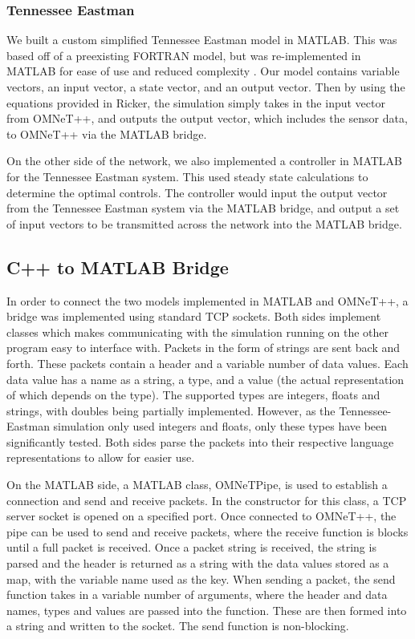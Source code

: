 \subsubsection{Tennessee Eastman}
  We built a custom simplified Tennessee Eastman model in MATLAB.  
  This was based off of a preexisting FORTRAN model, but was
  re-implemented in MATLAB for ease of use and reduced complexity 
  .  Our model contains variable vectors, an
  input vector, a state vector, and an output vector. Then by 
  using the equations provided in Ricker, the
  simulation simply takes in the input vector from OMNeT++, and
  outputs the output vector, which includes the sensor data, to
  OMNeT++ via the MATLAB bridge.

  On the other side of the network, we also implemented a 
  controller in MATLAB for the Tennessee Eastman system.  This
  used steady state calculations to determine the optimal controls.
  The controller would input the output vector from the Tennessee
  Eastman system via the MATLAB bridge, and output a set of input
  vectors to be transmitted across the network into the MATLAB
  bridge.

\subsection{C++ to MATLAB Bridge}

In order to connect the two models implemented in MATLAB and OMNeT++, a bridge was implemented using standard TCP sockets. Both sides implement classes which makes communicating with the simulation running on the other program easy to interface with. Packets in the form of strings are sent back and forth. These packets contain a header and a variable number of data values. Each data value has a name as a string, a type, and a value (the actual representation of which depends on the type). The supported types are integers, floats and strings, with doubles being partially implemented. However, as the Tennessee-Eastman simulation only used integers and floats, only these types have been significantly tested. Both sides parse the packets into their respective language representations to allow for easier use.

On the MATLAB side, a MATLAB class, OMNeTPipe, is used to establish a connection and send and receive packets. In the constructor for this class, a TCP server socket is opened on a specified port. Once connected to OMNeT++, the pipe can be used to send and receive packets, where the receive function is blocks until a full packet is received. Once a packet string is received, the string is parsed and the header is returned as a string with the data values stored as a map, with the variable name used as the key. When sending a packet, the send function takes in a variable number of arguments, where the header and data names, types and values are passed into the function. These are then formed into a string and written to the socket. The send function is non-blocking.

